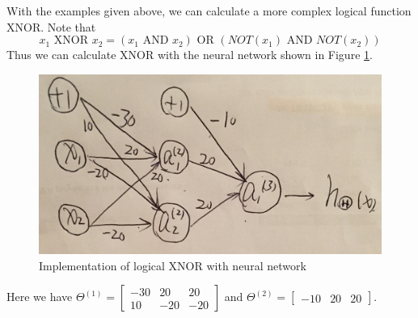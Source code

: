 With the examples given above, we can calculate a more complex logical function XNOR. Note that
$$ x_1 \text{ XNOR } x_2 = (x_1 \text{ AND } x_2) \text{ OR } (NOT(x_1) \text{ AND } NOT(x_2))$$
Thus we can calculate XNOR with the neural network shown in Figure \ref{neuralxnor}.
\begin{figure}[ht]
\centering
\includegraphics[width = 0.8 \textwidth]{neuralxnor.jpg}
\caption{Implementation of logical XNOR with neural network}\label{neuralxnor}
\end{figure}

Here we have \begin{math}\Theta^{(1)} = \begin{bmatrix}-30 & 20 & 20\\10 & -20 & -20\end{bmatrix}\end{math}
and \begin{math}\Theta^{(2)} = \begin{bmatrix}-10 & 20 & 20\end{bmatrix}\end{math}.

\ifx\PREAMBLE\undefined

\fi